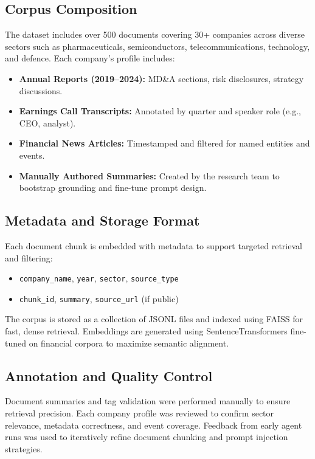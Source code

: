 \documentclass[11pt]{article}
\begin{document}
\subsection*{Corpus Composition}
The dataset includes over 500 documents covering 30+ companies across diverse sectors such as pharmaceuticals, semiconductors, telecommunications, technology, and defence. Each company’s profile includes:
\begin{itemize}
    \item \textbf{Annual Reports (2019–2024):} MD\&A sections, risk disclosures, strategy discussions.
    \item \textbf{Earnings Call Transcripts:} Annotated by quarter and speaker role (e.g., CEO, analyst).
    \item \textbf{Financial News Articles:} Timestamped and filtered for named entities and events.
    \item \textbf{Manually Authored Summaries:} Created by the research team to bootstrap grounding and fine-tune prompt design.
\end{itemize}

\subsection*{Metadata and Storage Format}
Each document chunk is embedded with metadata to support targeted retrieval and filtering:
\begin{itemize}
    \item \texttt{company\_name}, \texttt{year}, \texttt{sector}, \texttt{source\_type}
    \item \texttt{chunk\_id}, \texttt{summary}, \texttt{source\_url} (if public)
\end{itemize}
The corpus is stored as a collection of JSONL files and indexed using FAISS for fast, dense retrieval. Embeddings are generated using SentenceTransformers fine-tuned on financial corpora to maximize semantic alignment.

\subsection*{Annotation and Quality Control}
Document summaries and tag validation were performed manually to ensure retrieval precision. Each company profile was reviewed to confirm sector relevance, metadata correctness, and event coverage. Feedback from early agent runs was used to iteratively refine document chunking and prompt injection strategies.
\end{document}
